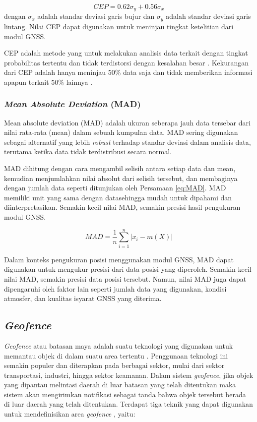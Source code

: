 \begin{equation}
CEP = 0.62 \sigma_y + 0.56 \sigma_x
\label{eq:CEP}
\end{equation}
dengan $\sigma_x$ adalah standar deviasi garis bujur dan $\sigma_y$ adalah standar deviasi garis lintang. Nilai CEP dapat digunakan untuk meninjau tingkat ketelitian dari modul GNSS.

CEP adalah metode yang untuk melakukan analisis data terkait dengan tingkat probabilitas tertentu dan tidak terdistorsi dengan kesalahan besar \cite{Chin1983}. Kekurangan dari CEP adalah hanya meninjau 50\% data saja dan tidak memberikan informasi apapun terkait 50\% lainnya \cite{Sathish2016}.

\subsubsection{\textit{Mean Absolute Deviation} (MAD)}
Mean absolute deviation (MAD) adalah ukuran seberapa jauh data tersebar dari nilai rata-rata (mean) dalam sebuah kumpulan data. MAD sering digunakan sebagai alternatif yang lebih \textit{robust} terhadap standar deviasi dalam analisis data, terutama ketika data tidak terdistribusi secara normal.

MAD dihitung dengan cara mengambil selisih antara setiap data dan mean, kemudian menjumlahkan nilai absolut dari selisih tersebut, dan membaginya dengan jumlah data seperti ditunjukan oleh Persamaan \ref{eq:MAD}. MAD memiliki unit yang sama dengan datasehingga mudah untuk dipahami dan diinterpretasikan. Semakin kecil nilai MAD, semakin presisi hasil pengukuran modul GNSS.

\begin{equation}
	MAD = \frac{1}{n} \sum_{i=1}^{n} \left| x_i - m(X) \right|
	\label{eq:MAD}
\end{equation}

Dalam konteks pengukuran posisi menggunakan modul GNSS, MAD dapat digunakan untuk mengukur presisi dari data posisi yang diperoleh. Semakin kecil nilai MAD, semakin presisi data posisi tersebut. Namun, nilai MAD juga dapat dipengaruhi oleh faktor lain seperti jumlah data yang digunakan, kondisi atmosfer, dan kualitas isyarat GNSS yang diterima.

\subsection{\textit{Geofence}}
\textit{Geofence} atau batasan maya adalah suatu teknologi yang digunakan untuk memantau objek di dalam suatu area tertentu \cite{Sari2021}. Penggunaan teknologi ini semakin populer dan diterapkan pada berbagai sektor, mulai dari sektor transportasi, industri, hingga sektor keamanan. Dalam sistem \textit{geofence}, jika objek yang dipantau melintasi daerah di luar batasan yang telah ditentukan maka sistem akan mengirimkan notifikasi sebagai tanda bahwa objek tersebut berada di luar daerah yang telah ditentukan. Terdapat tiga teknik yang dapat digunakan untuk mendefinisikan area \textit{geofence} \cite{Rui2015}, yaitu:

